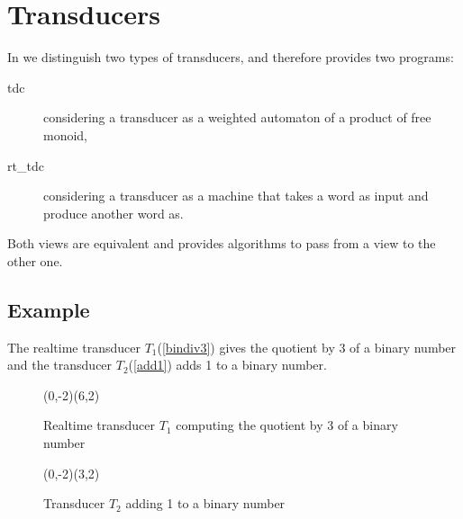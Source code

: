 \newpage
\section{Transducers}

In \Vauc we distinguish two types of transducers, and therefore
provides two programs:
\begin{description}
\item[tdc] considering a transducer as a weighted automaton of a
  product of free monoid,
\item[rt\_tdc] considering a transducer as a machine that takes a word
  as input and produce another word as.
\end{description}
Both views are equivalent and \Vauc provides algorithms to pass from a
view to the other one.

\subsection{Example}

The realtime transducer $T_1$(\autoref{bindiv3}) gives the quotient by
3 of a binary number and the transducer $T_2$(\autoref{add1}) adds 1 to a
binary number.


\begin{figure}[h]
  \begin{center}
    \begin{VCPicture}{(0,-2)(6,2)}
  
\end{VCPicture}
\caption{Realtime transducer $T_1$ computing the quotient by 3 of a binary number}
\label{bindiv3}
  \end{center}
\end{figure}
\begin{figure}[h]
  \begin{center}
    \begin{VCPicture}{(0,-2)(3,2)}
 
\end{VCPicture}
\caption{Transducer $T_2$ adding 1 to a binary number}
\label{add1}
  \end{center}
\end{figure}

